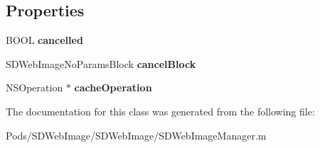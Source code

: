 \subsection*{Properties}
\begin{DoxyCompactItemize}
\item 
\mbox{\label{interface_s_d_web_image_combined_operation_acf3810fedf06f6a8887e0e07bff9bc1c}} 
B\+O\+OL {\bfseries cancelled}
\item 
\mbox{\label{interface_s_d_web_image_combined_operation_a7ed450983562183c3cfbdb628ce9751d}} 
S\+D\+Web\+Image\+No\+Params\+Block {\bfseries cancel\+Block}
\item 
\mbox{\label{interface_s_d_web_image_combined_operation_ae392a0380e8d6f3a3df6503c6b40a49c}} 
N\+S\+Operation $\ast$ {\bfseries cache\+Operation}
\end{DoxyCompactItemize}


The documentation for this class was generated from the following file\+:\begin{DoxyCompactItemize}
\item 
Pods/\+S\+D\+Web\+Image/\+S\+D\+Web\+Image/S\+D\+Web\+Image\+Manager.\+m\end{DoxyCompactItemize}
